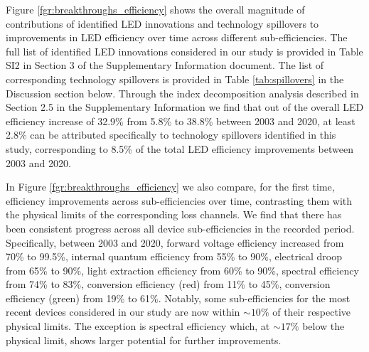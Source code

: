 \documentclass[parskip=full]{article}
\begin{document}
Figure \ref{fgr:breakthroughs_efficiency} shows the overall magnitude of contributions of identified LED innovations and technology spillovers to improvements in LED efficiency over time across different sub-efficiencies. The full list of identified LED innovations considered in our study is provided in Table SI2 in Section 3 of the Supplementary Information document. The list of corresponding technology spillovers is provided in Table \ref{tab:spillovers} in the Discussion section below. Through the index decomposition analysis described in Section 2.5 in the Supplementary Information we find that out of the overall LED efficiency increase of 32.9\% from 5.8\% to 38.8\% between 2003 and 2020, at least 2.8\% can be attributed specifically to technology spillovers identified in this study, corresponding to 8.5\% of the total LED efficiency improvements between 2003 and 2020.

In Figure \ref{fgr:breakthroughs_efficiency} we also compare, for the first time, efficiency improvements across sub-efficiencies over time, contrasting them with the physical limits of the corresponding loss channels. We find that there has been consistent progress across all device sub-efficiencies in the recorded period. Specifically, between 2003 and 2020, forward voltage efficiency increased from 70\% to 99.5\%, internal quantum efficiency from 55\% to 90\%, electrical droop from 65\% to 90\%, light extraction efficiency from 60\% to 90\%, spectral efficiency from 74\% to 83\%, conversion efficiency (red) from 11\% to 45\%, conversion efficiency (green) from 19\% to 61\%. Notably, some sub-efficiencies for the most recent devices considered in our study are now within $\sim10\%$ of their respective physical limits. The exception is spectral efficiency which, at $\sim17\%$ below the physical limit, shows larger potential for further improvements.
\end{document}
